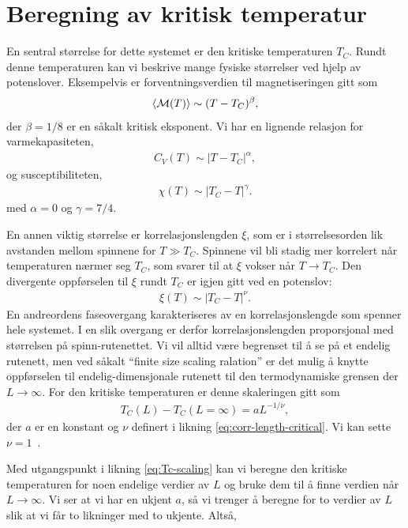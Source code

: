 \documentclass[11pt, twocolumn]{article}
\begin{document}
\section{Beregning av kritisk temperatur}
En sentral størrelse for dette systemet er den kritiske temperaturen
$T_C$. Rundt denne temperaturen kan vi beskrive mange fysiske
størrelser ved hjelp av potenslover. Eksempelvis er
forventningsverdien til magnetiseringen gitt som 
\begin{align}
  \langle \mathcal{M}(T) \rangle \sim (T - T_C)^{\beta},
\end{align}
der $\beta=1/8$ er en såkalt kritisk eksponent. Vi har en lignende
relasjon for varmekapasiteten,
\begin{align}
  C_V(T) \sim |T-T_C|^{\alpha},
\end{align}
og susceptibiliteten,
\begin{align}
  \chi(T) \sim |T_C - T|^{\gamma}.
\end{align}
med $\alpha=0$ og $\gamma=7/4$.

En annen viktig størrelse er korrelasjonslengden $\xi$, som er i
størrelsesorden lik avstanden mellom spinnene for $T\gg T_C$. Spinnene
vil bli stadig mer korrelert når temperaturen nærmer seg $T_C$, som
svarer til at $\xi$ vokser når $T\rightarrow T_C$. Den divergente
oppførselen til $\xi$ rundt $T_C$ er igjen gitt ved en potenslov:
\begin{align}
  \xi(T) \sim |T_C - T|^\nu.\label{eq:corr-length-critical}
\end{align}
En andreordens faseovergang karakteriseres av en korrelasjonslengde
som spenner hele systemet. I en slik overgang er derfor
korrelasjonslengden proporsjonal med størrelsen på
spinn-rutenettet. Vi vil alltid være begrenset til å se på et endelig
rutenett, men ved såkalt ``finite size scaling ralation'' er det mulig
å knytte oppførselen til endelig-dimensjonale rutenett til den
termodynamiske grensen der $L\rightarrow\infty$. For den kritiske
temperaturen er denne skaleringen gitt som 
\begin{align}
  T_C(L) - T_C(L=\infty) = aL^{-1/\nu}\label{eq:Tc-scaling},
\end{align} 
der $a$ er en konstant og $\nu$ definert i likning \eqref{eq:corr-length-critical}.  Vi kan sette
$\nu=1$~\cite{oppgavetekst-prosjekt-4}. 

\vspace{\baselineskip}

Med utgangspunkt i likning \eqref{eq:Tc-scaling} kan vi beregne den
kritiske temperaturen for noen endelige verdier av $L$ og bruke dem
til å finne verdien når $L\rightarrow\infty$. Vi ser at vi har en
ukjent $a$, så vi trenger å beregne for to verdier av $L$ slik at vi
får to likninger med to ukjente. Altså,
\end{document}

